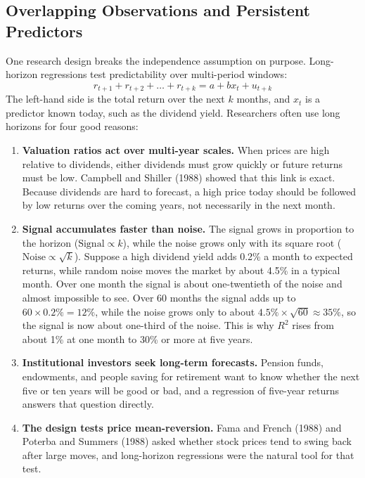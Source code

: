 \subsection{Overlapping Observations and Persistent Predictors}
\label{sec:03-overlap}
One research design breaks the independence assumption on purpose. Long-horizon regressions test predictability over multi-period windows:
\begin{equation}
  r_{t+1} + r_{t+2} + \dots + r_{t+k} = a + b x_t + u_{t+k}
  \label{eq:03-overlap}
\end{equation}
The left-hand side is the total return over the next $k$ months, and $x_t$ is a predictor known today, such as the dividend yield. Researchers often use long horizons for four good reasons:
\begin{enumerate}
  \item \textbf{Valuation ratios act over multi-year scales.} When prices are high relative to dividends, either dividends must grow quickly or future returns must be low. Campbell and Shiller (1988) showed that this link is exact. Because dividends are hard to forecast, a high price today should be followed by low returns over the coming years, not necessarily in the next month.
  \item \textbf{Signal accumulates faster than noise.} The signal grows in proportion to the horizon ($\text{Signal} \propto k$), while the noise grows only with its square root ($\text{Noise} \propto \sqrt{k}$). Suppose a high dividend yield adds 0.2\% a month to expected returns, while random noise moves the market by about 4.5\% in a typical month. Over one month the signal is about one-twentieth of the noise and almost impossible to see. Over 60 months the signal adds up to $60 \times 0.2\% = 12\%$, while the noise grows only to about $4.5\% \times \sqrt{60} \approx 35\%$, so the signal is now about one-third of the noise. This is why $R^2$ rises from about 1\% at one month to 30\% or more at five years.
  \item \textbf{Institutional investors seek long-term forecasts.} Pension funds, endowments, and people saving for retirement want to know whether the next five or ten years will be good or bad, and a regression of five-year returns answers that question directly.
  \item \textbf{The design tests price mean-reversion.} Fama and French (1988) and Poterba and Summers (1988) asked whether stock prices tend to swing back after large moves, and long-horizon regressions were the natural tool for that test.
\end{enumerate}

